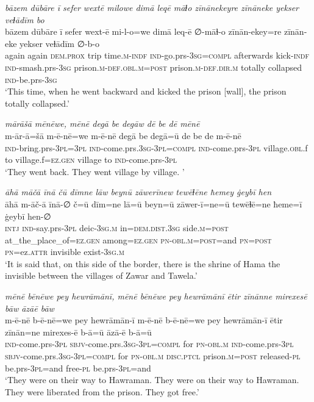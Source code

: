 \ea \label{BP.173}
\textit{bāzem dūbāre ī sefer wextē milowe dimā leqē māɫo zīnānekeyre zīnāneke yekser veɫādīm bo} \\ 
\gll bāzem dūbāre ī sefer wext-ē mi-l-o=we dimā leq-ē ∅-māɫ-o zīnān-ekey=re zīnān-eke yekser veɫādīm ∅-b-o \\ 
 again again \textsc{dem.prox} trip time\textsc{.m}\textsc{-indf} \textsc{ind-}go.prs\textsc{-3sg}\textsc{=compl} afterwards kick\textsc{-indf} \textsc{ind-}smash.prs\textsc{-3sg} prison\textsc{.m}\textsc{-def}\textsc{.obl}\textsc{.m}\textsc{=\textsc{post}} prison\textsc{.m}\textsc{-def}\textsc{.dir}\textsc{.m} totally collapsed \textsc{ind-}be.prs\textsc{-3sg} \\ 
\glt `This time, when he went backward and kicked the prison [wall], the prison totally collapsed.'
\z 
 
\ea \label{BP.177}
\textit{mārāšā mēnēwe, mēnē degā be degāw dē be dē mēnē} \\ 
\gll m-ār-ā=šā m-ē-nē=we m-ē-nē degā be degā=ū de be de m-ē-nē \\ 
 \textsc{ind-}bring.prs\textsc{-3pl}\textsc{=3pl} \textsc{ind-}come.prs\textsc{.3sg}\textsc{-3pl}\textsc{=compl} \textsc{ind-}come.prs\textsc{-3pl} village\textsc{.obl}.f to village.f\textsc{=ez.gen} village to \textsc{ind-}come.prs\textsc{-3pl} \\ 
\glt `They went back. They went village by village. '
\z 
 
\ea \label{BP.178}
\textit{āhā māčā īnā čū dīmne lāw beynū zāwerīnew tewēɫēne ħemey ġeybī hen} \\ 
\gll āhā m-āč-ā īnā-∅ č=ū dīm=ne lā=ū beyn=ū zāwer-ī=ne=ū tewēɫē=ne ħeme=ī ġeybī hen-∅ \\ 
 \textsc{intj} \textsc{ind-}say.prs\textsc{-3pl} deic\textsc{-3sg}\textsc{.m} in=\textsc{dem.dist}\textsc{.3sg} side\textsc{.m}\textsc{=\textsc{post}} at\_the\_place\_of\textsc{=ez.gen} among\textsc{=ez.gen} \textsc{pn}\textsc{-obl}\textsc{.m}\textsc{=\textsc{post}}=and \textsc{pn}\textsc{=\textsc{post}} \textsc{pn}=ez.\textsc{attr} invisible exist\textsc{-3sg}\textsc{.m} \\ 
\glt `It is said that, on this side of the border, there is the shrine of Hama the invisible between the villages of Zawar and Tawela.'
\z 
 
\ea \label{BP.179}
\textit{mēnē bēnēwe pey hewrāmānī, mēnē bēnēwe pey hewrāmānī ētir zīnānne mirexesē bāw āzāē bāw} \\ 
\gll m-ē-nē b-ē-nē=we pey hewrāmān-ī m-ē-nē b-ē-nē=we pey hewrāmān-ī ētir zīnān=ne mirexes-ē b-ā=ū āzā-ē b-ā=ū \\ 
 \textsc{ind-}come.prs\textsc{-3pl} \textsc{sbjv-}come.prs\textsc{.3sg}\textsc{-3pl}\textsc{=compl} for \textsc{pn}\textsc{-obl}\textsc{.m} \textsc{ind-}come.prs\textsc{-3pl} \textsc{sbjv-}come.prs\textsc{.3sg}\textsc{-3pl}\textsc{=compl} for \textsc{pn}\textsc{-obl}\textsc{.m} \textsc{disc.ptcl} prison\textsc{.m}\textsc{=\textsc{post}} released\textsc{\textsc{-pl}} be.prs\textsc{-3pl}=and free\textsc{\textsc{-pl}} be.prs\textsc{-3pl}=and \\ 
\glt `They were on their way to Hawraman. They were on their way to Hawraman. They were liberated from the prison. They got free.'
\z 
 
